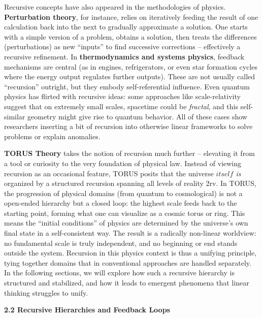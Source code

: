 \documentclass[
]{article}
\begin{document}
Recursive concepts have also appeared in the methodologies of physics.
\textbf{Perturbation theory}, for instance, relies on iteratively
feeding the result of one calculation back into the next to gradually
approximate a solution. One starts with a simple version of a problem,
obtains a solution, then treats the differences (perturbations) as new
``inputs'' to find successive corrections -- effectively a recursive
refinement. In \textbf{thermodynamics and systems physics}, feedback
mechanisms are central (as in engines, refrigerators, or even star
formation cycles where the energy output regulates further outputs).
These are not usually called ``recursion'' outright, but they embody
self-referential influence. Even quantum physics has flirted with
recursive ideas: some approaches like scale-relativity suggest that on
extremely small scales, spacetime could be \emph{fractal}, and this
self-similar geometry might give rise to quantum behavior\hspace{0pt}.
All of these cases show researchers inserting a bit of recursion into
otherwise linear frameworks to solve problems or explain anomalies.

\textbf{TORUS Theory} takes the notion of recursion much further --
elevating it from a tool or curiosity to the very foundation of physical
law. Instead of viewing recursion as an occasional feature, TORUS posits
that the universe \emph{$itself$ is} organized by a structured recursion
spanning all levels of reality\hspace{0pt} 2rv. In TORUS, the
progression of physical domains (from quantum to cosmological) is not a
open-ended hierarchy but a closed loop: the highest scale feeds back to
the starting point, forming what one can visualize as a cosmic torus or
ring. This means the ``initial conditions'' of physics are determined by
the universe's own final state in a self-consistent way. The result is a
radically non-linear worldview: no fundamental scale is truly
independent, and no beginning or end stands outside the system.
Recursion in this physics context is thus a unifying principle, tying
together domains that in conventional approaches are handled separately.
In the following sections, we will explore how such a recursive
hierarchy is structured and stabilized, and how it leads to emergent
phenomena that linear thinking struggles to unify.

\textbf{2.2 Recursive Hierarchies and Feedback Loops}
\end{document}
